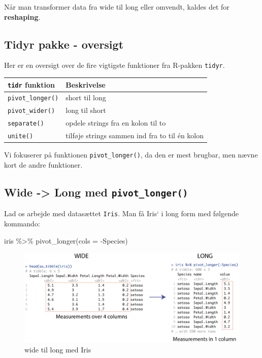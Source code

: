 \documentclass[
]{book}
\newenvironment{Shaded}{\begin{snugshade}}{\end{snugshade}}
\newcommand{\AttributeTok}[1]{\textcolor[rgb]{0.77,0.63,0.00}{#1}}
\newcommand{\FunctionTok}[1]{\textcolor[rgb]{0.00,0.00,0.00}{#1}}
\newcommand{\NormalTok}[1]{#1}
\newcommand{\SpecialCharTok}[1]{\textcolor[rgb]{0.00,0.00,0.00}{#1}}
\begin{document}
Når man transformer data fra wide til long eller omvendt, kaldes det for \textbf{reshaping}.

\hypertarget{tidyr-pakke---oversigt}{%
\subsection{Tidyr pakke - oversigt}\label{tidyr-pakke---oversigt}}

Her er en oversigt over de fire vigtigste funktioner fra R-pakken \texttt{tidyr}.

\begin{longtable}[]{@{}ll@{}}
\toprule
\texttt{tidr} funktion & Beskrivelse \\
\midrule
\endhead
\texttt{pivot\_longer()} & short til long \\
\texttt{pivot\_wider()} & long til short \\
\texttt{separate()} & opdele strings fra en kolon til to \\
\texttt{unite()} & tilføje strings sammen ind fra to til én kolon \\
\bottomrule
\end{longtable}

Vi fokuserer på funktionen \texttt{pivot\_longer()}, da den er mest brugbar, men nævne kort de andre funktioner.

\hypertarget{wide---long-med-pivot_longer}{%
\subsection{\texorpdfstring{Wide -\textgreater{} Long med \texttt{pivot\_longer()}}{Wide -\textgreater{} Long med pivot\_longer()}}\label{wide---long-med-pivot_longer}}

Lad os arbejde med datasættet \texttt{Iris}. Man få Iris` i long form med følgende kommando:

\begin{Shaded}
\begin{Highlighting}[]
\NormalTok{iris }\SpecialCharTok{\%\textgreater{}\%} \FunctionTok{pivot\_longer}\NormalTok{(}\AttributeTok{cols =} \SpecialCharTok{{-}}\NormalTok{Species)}
\end{Highlighting}
\end{Shaded}

\begin{figure}
\includegraphics[width=1\linewidth]{plots/wide_to_long} \caption{wide til long med Iris}\label{fig:unnamed-chunk-268}
\end{figure}
\end{document}

